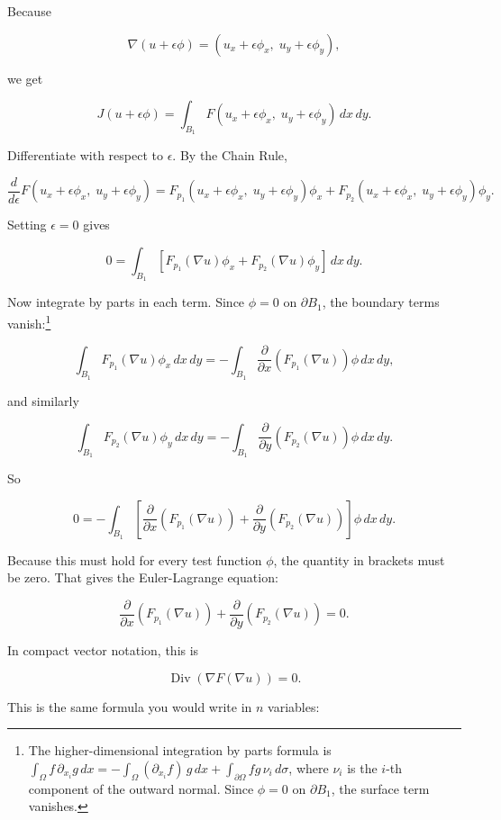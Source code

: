 \documentclass[11pt]{article}
\begin{document}
Because

\[
\nabla(u+\epsilon\phi)=(u_x+\epsilon\phi_x,\;u_y+\epsilon\phi_y),
\]

we get

\[
J(u+\epsilon\phi)=\int_{B_1} F(u_x+\epsilon\phi_x,\;u_y+\epsilon\phi_y)\,dx\,dy.
\]

Differentiate with respect to \(\epsilon\). By the Chain Rule,

\[
\frac{d}{d\epsilon}F(u_x+\epsilon\phi_x,\;u_y+\epsilon\phi_y)
=F_{p_1}(u_x+\epsilon\phi_x,\;u_y+\epsilon\phi_y)\phi_x
+F_{p_2}(u_x+\epsilon\phi_x,\;u_y+\epsilon\phi_y)\phi_y.
\]

Setting \(\epsilon=0\) gives

\[
0=\int_{B_1}\left[F_{p_1}(\nabla u)\phi_x+F_{p_2}(\nabla u)\phi_y\right]\,dx\,dy.
\]

Now integrate by parts in each term. Since \(\phi=0\) on
\(\partial B_1\), the boundary terms vanish:\footnote{The
  higher-dimensional integration by parts formula is
  \(\int_\Omega f\,\partial_{x_i} g\,dx = -\int_\Omega (\partial_{x_i} f)\,g\,dx + \int_{\partial\Omega} fg\,\nu_i\,d\sigma\),
  where \(\nu_i\) is the \(i\)-th component of the outward normal. Since
  \(\phi = 0\) on \(\partial B_1\), the surface term vanishes.}

\[
\int_{B_1} F_{p_1}(\nabla u)\phi_x\,dx\,dy
=-\int_{B_1}\frac{\partial}{\partial x}\!\left(F_{p_1}(\nabla u)\right)\phi\,dx\,dy,
\]

and similarly

\[
\int_{B_1} F_{p_2}(\nabla u)\phi_y\,dx\,dy
=-\int_{B_1}\frac{\partial}{\partial y}\!\left(F_{p_2}(\nabla u)\right)\phi\,dx\,dy.
\]

So

\[
0=-\int_{B_1}\left[
\frac{\partial}{\partial x}\!\left(F_{p_1}(\nabla u)\right)
+\frac{\partial}{\partial y}\!\left(F_{p_2}(\nabla u)\right)
\right]\phi\,dx\,dy.
\]

Because this must hold for every test function \(\phi\), the quantity in
brackets must be zero. That gives the Euler-Lagrange equation:
\hypertarget{eq-euler-lagrange}{}\label{eq-euler-lagrange}

\[
\frac{\partial}{\partial x}\!\left(F_{p_1}(\nabla u)\right)
+\frac{\partial}{\partial y}\!\left(F_{p_2}(\nabla u)\right)=0.
\]

In compact vector notation, this is

\[
\operatorname{Div}(\nabla F(\nabla u)) = 0.
\]

This is the same formula you would write in \(n\) variables:
\end{document}
